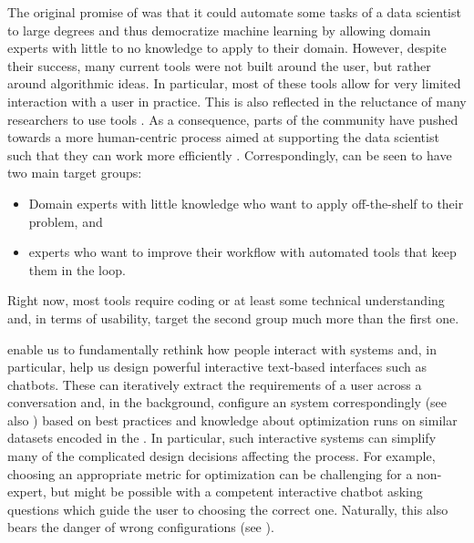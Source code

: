 The original promise of \AutoML was that it could automate some tasks of a data scientist to large degrees and thus democratize machine learning by allowing domain experts with little to no \ML knowledge to apply \ML to their domain. However, despite their success, many current \AutoML tools were not built around the user, but rather around algorithmic ideas. In particular, most of these tools allow for very limited interaction with a user in practice. This is also reflected in the reluctance of many researchers to use \AutoML tools \cite{blom-automl21a}. As a consequence, parts of the community have pushed towards a more human-centric \AutoML process aimed at supporting the data scientist such that they can work more efficiently \cite{lindauer-automlorg22,pfisterer-arxiv2019a}. Correspondingly, \AutoML can be seen to have two main target groups: 
\begin{itemize}
    \item Domain experts with little \ML knowledge who want to apply off-the-shelf \ML to their problem, and
    \item \ML experts who want to improve their workflow with automated tools that keep them in the loop. 
\end{itemize}
%
Right now, most \AutoML tools require coding or at least some technical understanding and, in terms of usability, target the second group much more than the first one. 

\LLMs enable us to fundamentally rethink how people interact with \AutoML systems and, in particular, help us design powerful interactive text-based interfaces such as chatbots. 
These can iteratively extract the requirements of a user across a conversation and, in the background, configure an \AutoML system correspondingly (see also ) based on \ML best practices and knowledge about optimization runs on similar datasets encoded in the \LLM. In particular, such interactive systems can simplify many of the complicated design decisions affecting the \AutoML process. For example, choosing an appropriate metric for optimization can be challenging for a non-expert, but might be possible with a competent interactive chatbot asking questions which guide the user to choosing the correct one. Naturally, this also bears the danger of wrong \AutoML configurations (see ).

